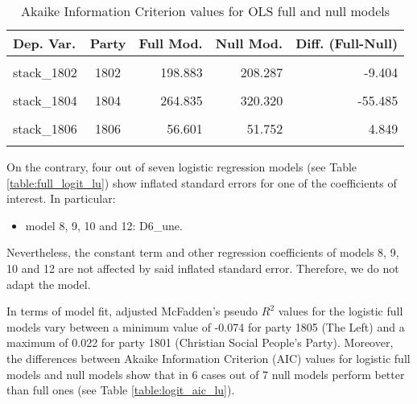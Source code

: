 \documentclass[
]{article}
\providecommand{\tightlist}{%
  \setlength{\itemsep}{0pt}\setlength{\parskip}{0pt}}
\begin{document}
\begin{table}[!h]

\caption{\label{tab:unnamed-chunk-118}Akaike Information Criterion values for OLS full and null models 
        \label{table:ols_aic_lu}}
\centering
\begin{tabular}[t]{lcrrr}
\toprule
Dep. Var. & Party & Full Mod. & Null Mod. & Diff. (Full-Null)\\
\midrule
\cellcolor{gray!6}{stack\_1801} & \cellcolor{gray!6}{1801} & \cellcolor{gray!6}{307.051} & \cellcolor{gray!6}{321.535} & \cellcolor{gray!6}{-14.484}\\
stack\_1802 & 1802 & 198.883 & 208.287 & -9.404\\
\cellcolor{gray!6}{stack\_1803} & \cellcolor{gray!6}{1803} & \cellcolor{gray!6}{252.751} & \cellcolor{gray!6}{277.718} & \cellcolor{gray!6}{-24.967}\\
stack\_1804 & 1804 & 264.835 & 320.320 & -55.485\\
\cellcolor{gray!6}{stack\_1805} & \cellcolor{gray!6}{1805} & \cellcolor{gray!6}{160.767} & \cellcolor{gray!6}{168.247} & \cellcolor{gray!6}{-7.480}\\
\addlinespace
stack\_1806 & 1806 & 56.601 & 51.752 & 4.849\\
\cellcolor{gray!6}{stack\_1807} & \cellcolor{gray!6}{1807} & \cellcolor{gray!6}{28.790} & \cellcolor{gray!6}{45.389} & \cellcolor{gray!6}{-16.599}\\
\bottomrule
\end{tabular}
\end{table}

On the contrary, four out of seven logistic regression models (see Table \ref{table:full_logit_lu}) show inflated standard errors for one of the coefficients of interest. In particular:

\begin{itemize}
\tightlist
\item
  model 8, 9, 10 and 12: D6\_une.
\end{itemize}

Nevertheless, the constant term and other regression coefficients of models 8, 9, 10 and 12 are not affected by said inflated standard error. Therefore, we do not adapt the model.

In terms of model fit, adjusted McFadden's pseudo \(R^2\) values for the logistic full models vary between
a minimum value of
-0.074
for party 1805
(The Left)
and a maximum of
0.022
for party 1801
(Christian Social People's Party).
Moreover, the differences between Akaike Information Criterion (AIC) values for logistic full models and
null models show that in 6 cases out of 7 null models perform better than full ones (see Table
\ref{table:logit_aic_lu}).
\end{document}
